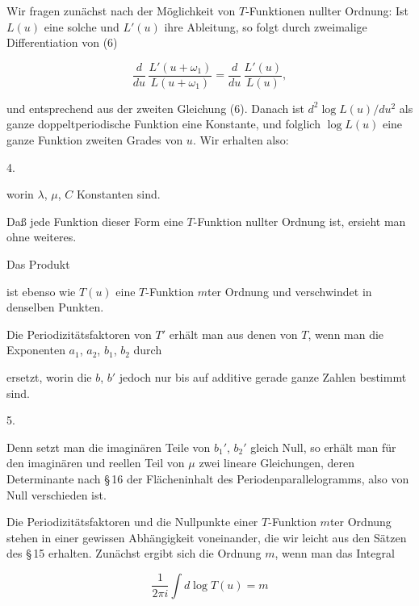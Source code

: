 
Wir fragen zunächst nach der Möglichkeit von $T$-Funktionen nullter Ordnung: Ist $L(u)$ eine solche und $L'(u)$ ihre Ableitung, so folgt durch zweimalige Differentiation von (6)

\[
\frac{d}{du}\,\frac{L'(u+\omega_1)}{L(u+\omega_1)} = \frac{d}{du}\,\frac{L'(u)}{L(u)},
\]

und entsprechend aus der zweiten Gleichung (6). Danach ist $d^2\log L(u)/du^2$ als ganze doppeltperiodische Funktion eine Konstante, und folglich $\log L(u)$ eine ganze Funktion zweiten Grades von $u$. Wir erhalten also:

4. 


worin $\lambda$, $\mu$, $C$ Konstanten sind.

Daß jede Funktion dieser Form eine $T$-Funktion nullter Ordnung ist, ersieht man ohne weiteres.

Das Produkt


ist ebenso wie $T(u)$ eine $T$-Funktion $m$ter Ordnung und verschwindet in denselben Punkten.

Die Periodizitätsfaktoren von $T'$ erhält man aus denen von $T$, wenn man die Exponenten $a_1$, $a_2$, $b_1$, $b_2$ durch


ersetzt, worin die $b$, $b'$ jedoch nur bis auf additive gerade ganze Zahlen bestimmt sind.

5. 

Denn setzt man die imaginären Teile von $b_1'$, $b_2'$ gleich Null, so erhält man für den imaginären und reellen Teil von $\mu$ zwei lineare Gleichungen, deren Determinante nach \S\,16 der Flächeninhalt des Periodenparallelogramms, also von Null verschieden ist.

Die Periodizitätsfaktoren und die Nullpunkte einer $T$-Funktion $m$ter Ordnung stehen in einer gewissen Abhängigkeit voneinander, die wir leicht aus den Sätzen des \S\,15 erhalten. Zunächst ergibt sich die Ordnung $m$, wenn man das Integral

\[
\frac{1}{2\pi i}\int d\log T(u) = m
\]
